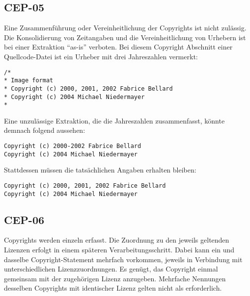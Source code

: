 
\subsection{CEP-05}\label{subsec:cep-05}

Eine Zusammenführung oder Vereinheitlichung der Copyrights ist nicht zulässig.
Die Konsolidierung von Zeitangaben und die Vereinheitlichung von Urhebern ist bei einer Extraktion \enquote{as-is} verboten.
Bei diesem Copyright Abschnitt einer Quellcode-Datei ist ein Urheber mit drei Jahreszahlen vermerkt:

\begin{lstlisting}[numbers=none, keepspaces=true]
/*
* Image format
* Copyright (c) 2000, 2001, 2002 Fabrice Bellard
* Copyright (c) 2004 Michael Niedermayer
*
\end{lstlisting}

Eine unzulässige Extraktion, die die Jahreszahlen zusammenfasst, könnte demnach folgend aussehen:

\begin{lstlisting}[numbers=none, keepspaces=true]
Copyright (c) 2000-2002 Fabrice Bellard
Copyright (c) 2004 Michael Niedermayer
\end{lstlisting}

Stattdessen müssen die tatsächlichen Angaben erhalten bleiben:

\begin{lstlisting}[numbers=none, keepspaces=true]
Copyright (c) 2000, 2001, 2002 Fabrice Bellard
Copyright (c) 2004 Michael Niedermayer
\end{lstlisting}


\subsection{CEP-06}\label{subsec:cep-06}

Copyrights werden einzeln erfasst.
Die Zuordnung zu den jeweils geltenden Lizenzen erfolgt in einem späteren Verarbeitungsschritt.
Dabei kann ein und dasselbe Copyright-Statement mehrfach vorkommen, jeweils in Verbindung mit unterschiedlichen Lizenzzuordnungen.
Es genügt, das Copyright einmal gemeinsam mit der zugehörigen Lizenz anzugeben.
Mehrfache Nennungen desselben Copyrights mit identischer Lizenz gelten nicht als erforderlich.

